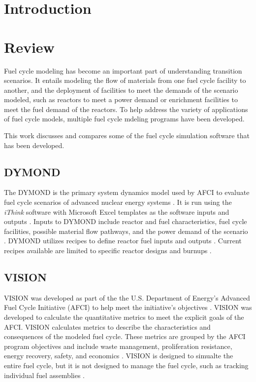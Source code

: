 \documentclass{article}
\begin{document}
    \section{Introduction}
    

    \section{Review}
    Fuel cycle modeling has become an important part of understanding 
    transition scenarios. It entails modeling the flow of materials 
    from one fuel cycle facility to another, and the deployment of 
    facilities to meet the demands of the scenario modeled, such as
    reactors to meet a power demand or enrichment facilities to meet 
    the fuel demand of the reactors. To help address the 
    variety of applications 
    of fuel cycle models, multiple fuel cycle mdeling programs have 
    been developed. 

    This work discusses and compares some of the fuel cycle simulation 
    software that has been developed. 
    
    \subsection{DYMOND}
    The \gls{DYMOND} is the primary 
    system dynamics model used by AFCI to evaluate fuel cycle scenarios of 
    advanced nuclear energy systems \cite{yacout_visionverifiable_2006}.
    It is run using the \textit{iThink} software with Microsoft Excel 
    templates as the software inputs and outputs \cite{feng_standardized_2016}.
    Inputs to DYMOND include reactor and fuel characteristics, fuel cycle
    facilities, possible material flow pathways, and the power demand of the 
    scenario \cite{feng_standardized_2016}. 
    \gls{DYMOND} utilizes recipes to define reactor fuel inputs and outputs 
    \cite{yacout_visionverifiable_2006}. Current recipes available are limited 
    to specific reactor designs and burnups \cite{yacout_visionverifiable_2006}.

    \subsection{VISION}
    \Ac{VISION} was developed as part 
    of the the U.S. Department of Energy's Advanced Fuel Cycle Initiative 
    (AFCI) to help meet the initiative's objectives 
    \cite{yacout_visionverifiable_2006}. VISION was developed to 
    calculate the quantitative metrics to meet the explicit goals of the 
    AFCI. VISION calculates metrics to describe the characteristics and 
    consequences of the modeled fuel cycle. These metrics are grouped by the 
    AFCI program objectives and include waste management, proliferation 
    resistance, energy recovery, safety, and economics 
    \cite{yacout_visionverifiable_2006}. VISION is designed to simualte the 
    entire fuel cycle, but it is not designed to manage the fuel cycle, such 
    as tracking individual fuel assemblies \cite{yacout_visionverifiable_2006}.
\end{document}
